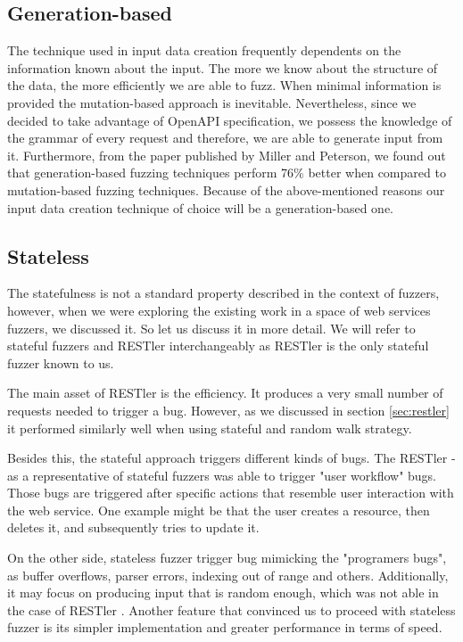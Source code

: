 \subsection{Generation-based}
The technique used in input data creation frequently dependents on the information known about the input. The more we know about the structure of the data, the more efficiently we are able to fuzz. When minimal information is provided the mutation-based approach is inevitable. Nevertheless, since we decided to take advantage of OpenAPI specification, we possess the knowledge of the grammar of every request and therefore, we are able to generate input from it. Furthermore, from the paper published by Miller and Peterson, we found out that generation-based fuzzing techniques perform 76\% better when compared to mutation-based fuzzing techniques\cite{miller2007analysis}. Because of the above-mentioned reasons our input data creation technique of choice will be a generation-based one.

\subsection{Stateless}
The statefulness is not a standard property described in the context of fuzzers, however, when we were exploring the existing work in a space of web services fuzzers, we discussed it. So let us discuss it in more detail. We will refer to stateful fuzzers and RESTler interchangeably as RESTler is the only stateful fuzzer known to us.

The main asset of RESTler is the efficiency. It produces a very small number of requests needed to trigger a bug. However, as we discussed in section \ref{sec:restler} it performed similarly well when using stateful and random walk strategy.

Besides this, the stateful approach triggers different kinds of bugs. The RESTler - as a representative of stateful fuzzers was able to trigger "user workflow" bugs. Those bugs are triggered after specific actions that resemble user interaction with the web service. One example might be that the user creates a resource, then deletes it, and subsequently tries to update it.

On the other side, stateless fuzzer trigger bug mimicking the "programers bugs", as buffer overflows, parser errors, indexing out of range and others. Additionally, it may focus on producing input that is random enough, which was not able in the case of RESTler \cite{atlidakis2019restler}. Another feature that convinced us to proceed with stateless fuzzer is its simpler implementation and greater performance in terms of speed.

